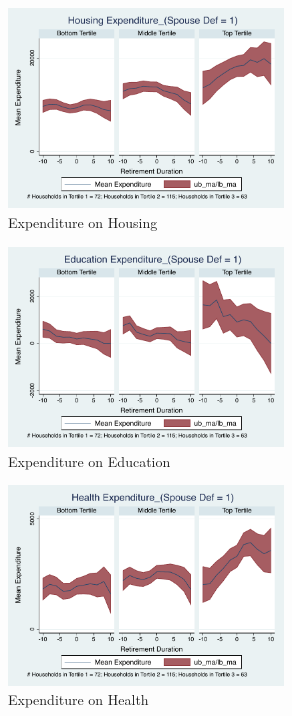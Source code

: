 \documentclass[11pt,onecolumn]{article}
\numberwithin{figure}{section}
\begin{document}
\begin{figure}[h]
	\caption{Expenditure on Housing}
	\centering
	\includegraphics[width=0.65\textwidth]{../ConsumptionPostRetirement_by_SpouseDef_Cats/Smoothed/1/spouse_def_total_housing_real.pdf}
\end{figure}


\begin{figure}[h]
	\caption{Expenditure on Education}
	\centering
	\includegraphics[width=0.65\textwidth]{../ConsumptionPostRetirement_by_SpouseDef_Cats/Smoothed/1/spouse_def_total_education_real.pdf}
\end{figure}
\clearpage

\begin{figure}[h]
	\caption{Expenditure on Health}
	\centering
	\includegraphics[width=0.65\textwidth]{../ConsumptionPostRetirement_by_SpouseDef_Cats/Smoothed/1/spouse_def_total_healthexpense_real.pdf}
\end{figure}
\end{document}
